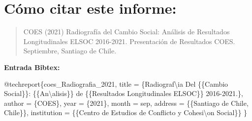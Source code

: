 \documentclass[
  12pt,
]{book}
\newenvironment{Shaded}{\begin{snugshade}}{\end{snugshade}}
\newcommand{\NormalTok}[1]{#1}
\newcommand{\OtherTok}[1]{\textcolor[rgb]{0.56,0.35,0.01}{#1}}
\newcommand{\SpecialCharTok}[1]{\textcolor[rgb]{0.00,0.00,0.00}{#1}}
\newcommand{\StringTok}[1]{\textcolor[rgb]{0.31,0.60,0.02}{#1}}
\begin{document}
\hypertarget{cuxf3mo-citar-este-informe}{%
\chapter*{Cómo citar este informe:}\label{cuxf3mo-citar-este-informe}}

\begin{quote}
COES (2021) Radiografía del Cambio Social: Análisis de Resultados Longitudinales ELSOC 2016-2021. Presentación de Resultados COES. Septiembre, Santiago de Chile.
\end{quote}

\textbf{Entrada Bibtex:}

\begin{Shaded}
\begin{Highlighting}[]
\SpecialCharTok{@}\NormalTok{techreport\{coes\_Radiografia\_2021,}
\NormalTok{  title }\OtherTok{=}\NormalTok{ \{Radiograf\textbackslash{}}\StringTok{\textquotesingle{}ia Del \{\{Cambio Social\}\}: \{\{An}\SpecialCharTok{\textbackslash{}\textquotesingle{}}\StringTok{alisis\}\} de \{\{Resultados Longitudinales ELSOC\}\} 2016{-}2021.\},}
\StringTok{  author = \{COES\},}
\StringTok{  year = \{2021\},}
\StringTok{  month = sep,}
\StringTok{  address = \{\{Santiago de Chile, Chile\}\},}
\StringTok{  institution = \{\{Centro de Estudios de Conflicto y Cohesi}\SpecialCharTok{\textbackslash{}\textquotesingle{}}\StringTok{on Social\}\}}
\StringTok{\}}
\end{Highlighting}
\end{Shaded}
\end{document}
